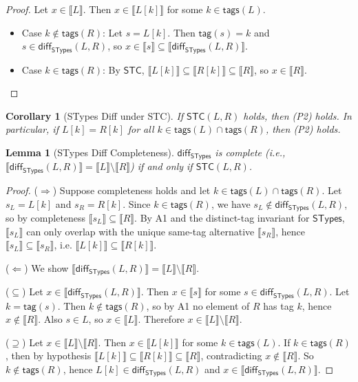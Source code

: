 \documentclass[11pt]{article}
\newtheorem{lemma}[theorem]{Lemma}
\newtheorem{corollary}[theorem]{Corollary}
\newcommand{\sem}[1]{\llbracket #1 \rrbracket}
\newcommand{\diff}{\mathsf{diff}}
\newcommand{\STypes}{\mathsf{STypes}}
\newcommand{\tagfn}{\mathsf{tag}}
\newcommand{\tags}{\mathsf{tags}}
\begin{document}
\begin{proof}
Let $x \in \sem{L}$. Then $x \in \sem{L[k]}$ for some $k \in \tags(L)$.
\begin{itemize}
\item Case $k \notin \tags(R)$: Let \(s=L[k]\). Then \(\tagfn(s)=k\) and \(s \in \diff_{\STypes}(L,R)\), so \(x \in \sem{s} \subseteq \sem{\diff_{\STypes}(L,R)}\).
\item Case $k \in \tags(R)$: By $\mathsf{STC}$, \(\sem{L[k]} \subseteq \sem{R[k]} \subseteq \sem{R}\), so \(x \in \sem{R}\).
\end{itemize}
\end{proof}

\begin{corollary}[STypes Diff under STC]
\label{cor:stypes-diff-under-stc}
If $\mathsf{STC}(L, R)$ holds, then (P2) holds.
In particular, if $L[k] = R[k]$ for all $k \in \tags(L) \cap \tags(R)$, then (P2) holds.
\end{corollary}

\begin{lemma}[STypes Diff Completeness]
\label{lem:stypes-diff-complete-iff-stc}
$\diff_{\STypes}$ is complete (i.e., $\sem{\diff_{\STypes}(L, R)} = \sem{L} \setminus \sem{R}$) 
if and only if $\mathsf{STC}(L, R)$.
\end{lemma}

\begin{proof}
($\Rightarrow$) Suppose completeness holds and let $k \in \tags(L) \cap \tags(R)$.
Let \(s_L=L[k]\) and \(s_R=R[k]\).
Since \(k \in \tags(R)\), we have \(s_L \notin \diff_{\STypes}(L,R)\), so by completeness \(\sem{s_L} \subseteq \sem{R}\).
By A1 and the distinct-tag invariant for \(\STypes\), \(\sem{s_L}\) can only overlap with the unique same-tag alternative \(\sem{s_R}\), hence \(\sem{s_L} \subseteq \sem{s_R}\), i.e. \(\sem{L[k]} \subseteq \sem{R[k]}\).

($\Leftarrow$) We show $\sem{\diff_{\STypes}(L, R)} = \sem{L} \setminus \sem{R}$.

($\subseteq$) Let $x \in \sem{\diff_{\STypes}(L, R)}$. Then $x \in \sem{s}$ for some $s \in \diff_{\STypes}(L,R)$.
Let \(k=\tagfn(s)\). Then \(k \notin \tags(R)\), so by A1 no element of \(R\) has tag \(k\), hence \(x \notin \sem{R}\).
Also \(s \in L\), so \(x \in \sem{L}\). Therefore \(x \in \sem{L} \setminus \sem{R}\).

($\supseteq$) Let $x \in \sem{L} \setminus \sem{R}$. Then \(x \in \sem{L[k]}\) for some \(k \in \tags(L)\).
If \(k \in \tags(R)\), then by hypothesis \(\sem{L[k]} \subseteq \sem{R[k]} \subseteq \sem{R}\), contradicting \(x \notin \sem{R}\).
So \(k \notin \tags(R)\), hence \(L[k] \in \diff_{\STypes}(L,R)\) and \(x \in \sem{\diff_{\STypes}(L, R)}\).
\end{proof}
\end{document}
